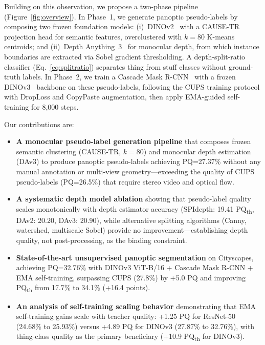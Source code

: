 \documentclass{bmvc2k}
\newcommand{\pqt}{PQ\textsubscript{th}\xspace}
\begin{document}
Building on this observation, we propose a two-phase pipeline (Figure~\ref{fig:overview}). In Phase~1, we generate panoptic pseudo-labels by composing two frozen foundation models: (i)~DINOv2~\cite{oquab2024dinov2} with a CAUSE-TR~\cite{kim2025cause} projection head for semantic features, overclustered with $k{=}80$ K-means centroids; and (ii)~Depth Anything~3~\cite{lin2025da3} for monocular depth, from which instance boundaries are extracted via Sobel gradient thresholding. A depth-split-ratio classifier (Eq.~\ref{eq:splitratio}) separates thing from stuff classes without ground-truth labels. In Phase~2, we train a Cascade Mask R-CNN~\cite{cai2021cascade} with a frozen DINOv3~\cite{fang2025dinov3} backbone on these pseudo-labels, following the CUPS training protocol with DropLoss and CopyPaste augmentation, then apply EMA-guided self-training for 8,000 steps.

Our contributions are:
\begin{itemize}
\item \textbf{A monocular pseudo-label generation pipeline} that composes frozen semantic clustering (CAUSE-TR, $k{=}80$) and monocular depth estimation (DAv3) to produce panoptic pseudo-labels achieving PQ=27.37\% without any manual annotation or multi-view geometry---exceeding the quality of CUPS pseudo-labels (PQ=26.5\%) that require stereo video and optical flow.

\item \textbf{A systematic depth model ablation} showing that pseudo-label quality scales monotonically with depth estimator accuracy (SPIdepth: 19.41 \pqt, DAv2: 20.20, DAv3: 20.90), while alternative splitting algorithms (Canny, watershed, multiscale Sobel) provide no improvement---establishing depth quality, not post-processing, as the binding constraint.

\item \textbf{State-of-the-art unsupervised panoptic segmentation} on Cityscapes, achieving PQ=32.76\% with DINOv3 ViT-B/16 + Cascade Mask R-CNN + EMA self-training, surpassing CUPS (27.8\%) by +5.0 PQ and improving \pqt from 17.7\% to 34.1\% (+16.4 points).

\item \textbf{An analysis of self-training scaling behavior} demonstrating that EMA self-training gains scale with teacher quality: +1.25 PQ for ResNet-50 (24.68\% to 25.93\%) versus +4.89 PQ for DINOv3 (27.87\% to 32.76\%), with thing-class quality as the primary beneficiary (+10.9 \pqt for DINOv3).
\end{itemize}
\end{document}
